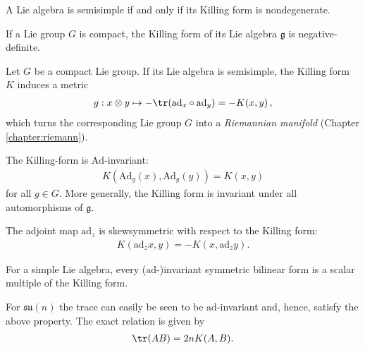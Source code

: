     \begin{theorem}
        A Lie algebra is semisimple if and only if its Killing form is nondegenerate.
    \end{theorem}

    \begin{property}
        If a Lie group $G$ is compact, the Killing form of its Lie algebra $\mathfrak{g}$ is negative-definite.
    \end{property}
    \begin{result}
        Let $G$ be a compact Lie group. If its Lie algebra is semisimple, the Killing form $K$ induces a metric
        \begin{gather}
            g:x\otimes y\mapsto-\tr(\mathrm{ad}_x\circ\mathrm{ad}_y) = -K(x,y)\,,
        \end{gather}
        which turns the corresponding Lie group $G$ into a \textit{Riemannian manifold} (Chapter \ref{chapter:riemann}).
    \end{result}

    \begin{property}
        The Killing-form is $\mathrm{Ad}$-invariant:
        \begin{gather}
            K(\mathrm{Ad}_g(x),\mathrm{Ad}_g(y)) = K(x,y)
        \end{gather}
        for all $g\in G$. More generally, the Killing form is invariant under all automorphisms of $\mathfrak{g}$.
    \end{property}
    \begin{result}
        The adjoint map $\mathrm{ad}_z$ is skewsymmetric with respect to the Killing form:
        \begin{gather}
            \label{lie:ad_killing_form}
            K(\mathrm{ad}_zx,y) = -K(x,\mathrm{ad}_zy).
        \end{gather}
    \end{result}

    \begin{property}\label{lie:killing_trace}
        For a simple Lie algebra, every ($\mathrm{ad}$-)invariant symmetric bilinear form is a scalar multiple of the Killing form.
    \end{property}
    \begin{example}
        For $\mathfrak{su}(n)$ the trace can easily be seen to be $\mathrm{ad}$-invariant and, hence, satisfy the above property. The exact relation is given by
        \begin{gather}
            \tr(AB) = 2nK(A,B).
        \end{gather}
    \end{example}

